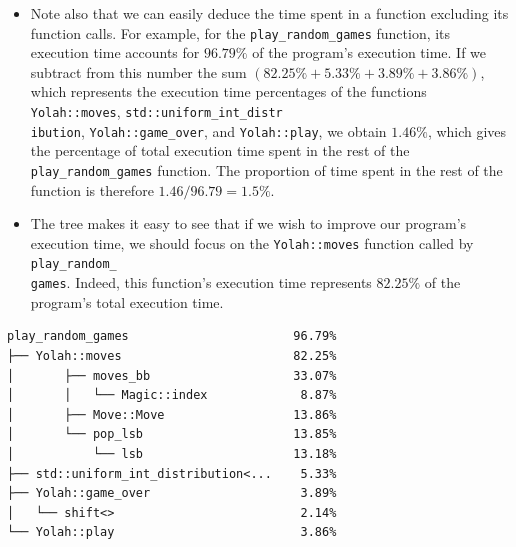 \documentclass[12pt,a4paper,twoside,openright]{book}
\begin{document}
\begin{itemize}
\item Note also that we can easily deduce the time spent in a function excluding its function calls. For example, for the \texttt{play_random_games} function, its execution time accounts for $96.79\%$ of the program's execution time. If we subtract from this number the sum $(82.25\% + 5.33\% + 3.89\% + 3.86\%)$, which represents the execution time percentages of the functions \texttt{Yolah::moves}, \texttt{std::uniform_int_distr}\\\texttt{ibution}, \texttt{Yolah::game_over}, and \texttt{Yolah::play}, we obtain $1.46\%$, which gives the percentage of total execution time spent in the rest of the \texttt{play_random_games} function. The proportion of time spent in the rest of the function is therefore $1.46/96.79 = 1.5\%$.
\item The tree makes it easy to see that if we wish to improve our program's execution time, we should focus on the \texttt{Yolah::moves} function called by \texttt{play_random_}\\\texttt{games}. Indeed, this function's execution time represents $82.25\%$ of the program's total execution time.
\end{itemize}

\begin{mdframed}[skipabove=\baselineskip,skipbelow=0pt,hidealllines=true,backgroundcolor=black!3,innerleftmargin=10pt,innerrightmargin=5pt,innertopmargin=0pt,innerbottommargin=5pt]
{\small
\begin{verbatim}
play_random_games                       96.79%
├── Yolah::moves                        82.25%
│       ├── moves_bb                    33.07%
│       │   └── Magic::index             8.87%
│       ├── Move::Move                  13.86%
│       └── pop_lsb                     13.85%
│           └── lsb                     13.18%
├── std::uniform_int_distribution<...    5.33%   
├── Yolah::game_over                     3.89%
│   └── shift<>                          2.14%
└── Yolah::play                          3.86%
\end{verbatim}
}
\end{mdframed}
\begin{mdframed}[skipabove=0pt,skipbelow=\baselineskip,hidealllines=true,innerleftmargin=10pt,innerrightmargin=5pt,innertopmargin=3pt,innerbottommargin=3pt]
\label{lst:chapter02_perf1}
\end{mdframed}
\end{document}

